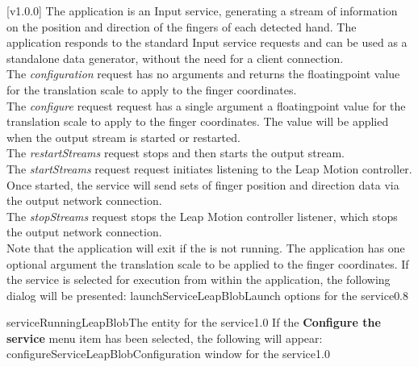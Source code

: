 [v1.0.0]
The  application is an Input service,
generating a stream of information on the position and direction of the fingers of each
detected hand.
The application responds to the standard Input service requests and can be used as a
standalone data generator, without the need for a client connection.\\

The \emph{configuration} request has no arguments and returns the floating\longDash{}point
value for the translation scale to apply to the finger coordinates.\\

The \emph{configure} request request has a single argument \longDash{} a
floating\longDash{}point value for the translation scale to apply to the finger
coordinates.
The value will be applied when the output stream is started or restarted.\\ 

The \emph{restartStreams} request stops and then starts the output stream.\\

The \emph{startStreams} request request initiates listening to the Leap Motion controller.
Once started, the service will send sets of finger position and direction data via the
output \yarp{} network connection.\\

The \emph{stopStreams} request stops the Leap Motion controller listener, which stops the
output \yarp{} network connection.\\ 

Note that the application will exit if the \emph{\RS} is not running.
The application has one optional argument \longDash{} the translation scale to be applied
to the finger coordinates.
\insertAppParameters
\insertTagDescription{\LBI}
\insertInputServiceComment
\condPage
\insertStandardServiceCommands
\secondaryEnd
\condPage
{}
If the service is selected for execution from within the \emph{\MMMU} application, the
following dialog will be presented:
%
{launchServiceLeapBlob}{Launch options for the \emph{\LBI} service}{0.8}

%
{serviceRunningLeapBlob}{The \emph{\MMMU} entity for the \emph{\LBI} service}{1.0}
\condPage{}
If the \textbf{Configure the service} menu item has been selected, the following will
appear:
%
{configureServiceLeapBlob}{Configuration window for the \emph{\LBI} service}{1.0}
\secondaryEnd
\primaryEnd{}
